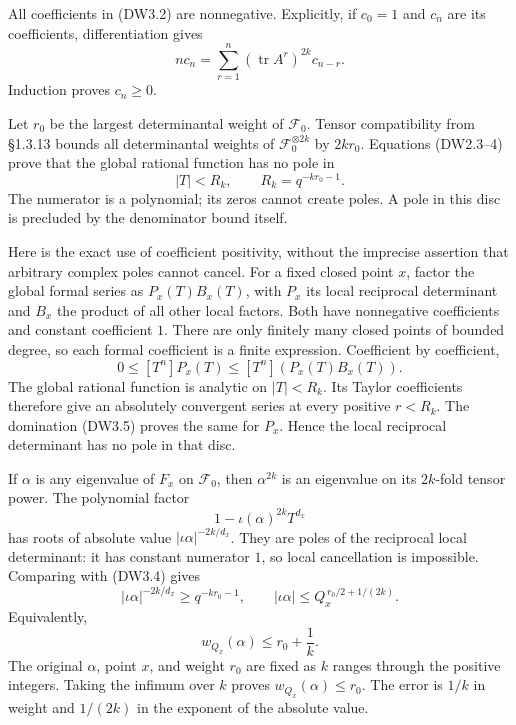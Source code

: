 All coefficients in (DW3.2) are nonnegative. Explicitly, if \(c_0=1\)
and \(c_n\) are its coefficients, differentiation gives \[
n c_n=\sum_{r=1}^n(\operatorname{tr}A^r)^{2k}c_{n-r}.
\tag{DW3.3}
\] Induction proves \(c_n\ge0\).

Let \(r_0\) be the largest determinantal weight of \(\mathcal F_0\).
Tensor compatibility from §1.3.13 bounds all determinantal weights of
\(\mathcal F_0^{\otimes2k}\) by \(2kr_0\). Equations (DW2.3--4) prove
that the global rational function has no pole in \[
|T|<R_k,\qquad R_k=q^{-kr_0-1}.
\tag{DW3.4}
\] The numerator is a polynomial; its zeros cannot create poles. A pole
in this disc is precluded by the denominator bound itself.

Here is the exact use of coefficient positivity, without the imprecise
assertion that arbitrary complex poles cannot cancel. For a fixed closed
point \(x\), factor the global formal series as \(P_x(T)B_x(T)\), with
\(P_x\) its local reciprocal determinant and \(B_x\) the product of all
other local factors. Both have nonnegative coefficients and constant
coefficient \(1\). There are only finitely many closed points of bounded
degree, so each formal coefficient is a finite expression. Coefficient
by coefficient, \[
0\le[T^n]P_x(T)\le[T^n](P_x(T)B_x(T)).
\tag{DW3.5}
\] The global rational function is analytic on \(|T|<R_k\). Its Taylor
coefficients therefore give an absolutely convergent series at every
positive \(r<R_k\). The domination (DW3.5) proves the same for \(P_x\).
Hence the local reciprocal determinant has no pole in that disc.

If \(\alpha\) is any eigenvalue of \(F_x\) on \(\mathcal F_0\), then
\(\alpha^{2k}\) is an eigenvalue on its \(2k\)-fold tensor power. The
polynomial factor \[
1-\iota(\alpha)^{2k}T^{d_x}
\tag{DW3.6}
\] has roots of absolute value \(|\iota\alpha|^{-2k/d_x}\). They are
poles of the reciprocal local determinant: it has constant numerator
\(1\), so local cancellation is impossible. Comparing with (DW3.4) gives
\[
|\iota\alpha|^{-2k/d_x}\ge q^{-kr_0-1},
\qquad
|\iota\alpha|\le Q_x^{\,r_0/2+1/(2k)}.
\tag{DW3.7}
\] Equivalently, \[
w_{Q_x}(\alpha)\le r_0+\frac1k.
\tag{DW3.8}
\] The original \(\alpha\), point \(x\), and weight \(r_0\) are fixed as
\(k\) ranges through the positive integers. Taking the infimum over
\(k\) proves \(w_{Q_x}(\alpha)\le r_0\). The error is \(1/k\) in weight
and \(1/(2k)\) in the exponent of the absolute value.

